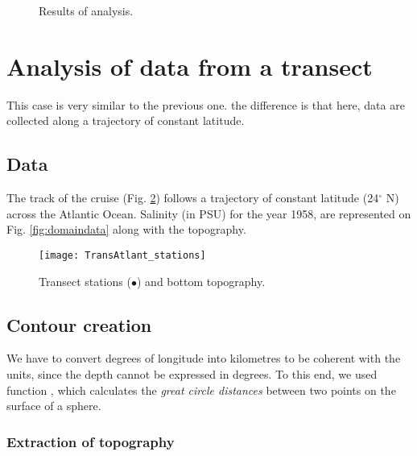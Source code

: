  
\begin{figure}[htpb]
\centering
{}
\caption{Results of analysis.\label{fig:analysis}}
\end{figure}





\section{Analysis of data from a transect}

This case is very similar to the previous one. the difference is that here, data are collected along a trajectory of constant latitude.
\subsection{Data}

The track of the cruise (Fig. \ref{fig:transectprofiles}) follows a trajectory of constant latitude (24$^{\circ}$ N) across the Atlantic Ocean. Salinity (in PSU) for the year 1958, are represented on Fig. \ref{fig:domaindata} along with the topography. 

\begin{figure}[htpb]
\centering
\texttt{[image: TransAtlant\_stations]}
\caption{Transect stations ($\bullet$) and bottom topography.\label{fig:transectprofiles}}
\end{figure}

\subsection{Contour creation}

We have to convert degrees of longitude into kilometres to be coherent with the units, since the depth cannot be expressed in degrees. To this end, we used \matlab function , which calculates the \textit{great circle distances} between two points on the surface of a sphere.  

\subsubsection{Extraction of topography}

